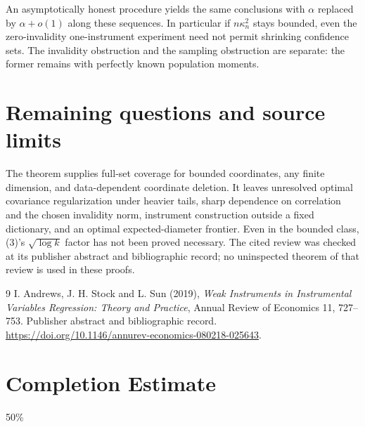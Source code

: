 \documentclass[11pt]{article}
\theoremstyle{remark}
\begin{document}
An asymptotically honest procedure yields the same conclusions with
$\alpha$ replaced by $\alpha+o(1)$ along these sequences. In particular
if $n\kappa_n^2$ stays bounded, even the zero-invalidity one-instrument
experiment need not permit shrinking confidence sets. The invalidity
obstruction and the sampling obstruction are separate: the former remains
with perfectly known population moments.

\section{Remaining questions and source limits}
The theorem supplies full-set coverage for bounded coordinates, any finite
dimension, and data-dependent coordinate deletion. It leaves unresolved
optimal covariance regularization under heavier tails, sharp dependence on
correlation and the chosen invalidity norm, instrument construction outside
a fixed dictionary, and an optimal expected-diameter frontier. Even in the
bounded class, (3)'s $\sqrt{\log k}$ factor has not been proved necessary.
The cited review was checked at its publisher abstract and bibliographic
record; no uninspected theorem of that review is used in these proofs.

\begin{thebibliography}{9}
 I. Andrews, J. H. Stock and L. Sun (2019),
\emph{Weak Instruments in Instrumental Variables Regression: Theory and
Practice}, Annual Review of Economics 11, 727--753. Publisher abstract
and bibliographic record.
\url{https://doi.org/10.1146/annurev-economics-080218-025643}.
\end{thebibliography}

\section{Completion Estimate}
50\%
\end{document}
